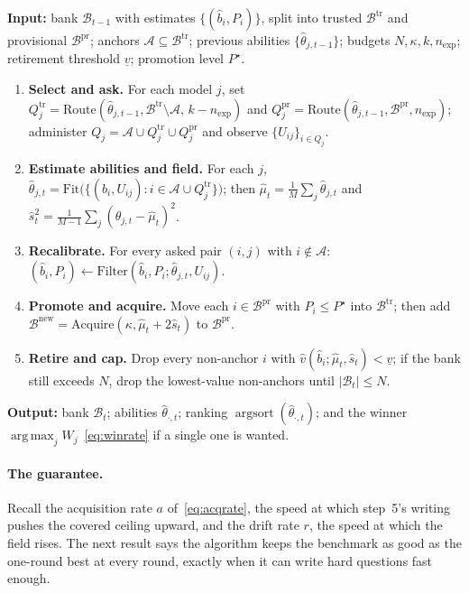 \documentclass[11pt]{article}
\newcommand{\cB}{\mathcal{B}}
\newcommand{\cA}{\mathcal{A}}
\newcommand{\nexp}{n_{\mathrm{exp}}}
\newcommand{\Fit}{\mathrm{Fit}}
\newcommand{\Route}{\mathrm{Route}}
\newcommand{\Filter}{\mathrm{Filter}}
\newcommand{\Acquire}{\mathrm{Acquire}}
\DeclareMathOperator*{\argmax}{arg\,max}
\DeclareMathOperator{\argsort}{argsort}
\theoremstyle{plain}
\theoremstyle{definition}
\theoremstyle{remark}
\begin{document}
\begin{algorithm}[t]
\caption{Online benchmark maintenance, round $t$}
\label{alg:main}
\textbf{Input:} bank $\cB_{t-1}$ with estimates $\{(\hat b_i,P_i)\}$, split into
trusted $\cB^{\mathrm{tr}}$ and provisional $\cB^{\mathrm{pr}}$; anchors
$\cA\subseteq\cB^{\mathrm{tr}}$; previous abilities $\{\hat\theta_{j,t-1}\}$; budgets
$N,\kappa,k,\nexp$; retirement threshold $\underline{v}$; promotion level $P^\star$.
\begin{enumerate}
\item \textbf{Select and ask.} For each model $j$, set
$Q^{\mathrm{tr}}_j=\Route(\hat\theta_{j,t-1},\cB^{\mathrm{tr}}\setminus\cA,\,k-\nexp)$
and $Q^{\mathrm{pr}}_j=\Route(\hat\theta_{j,t-1},\cB^{\mathrm{pr}},\nexp)$;
administer $Q_j=\cA\cup Q^{\mathrm{tr}}_j\cup Q^{\mathrm{pr}}_j$ and observe
$\{U_{ij}\}_{i\in Q_j}$.
\item \textbf{Estimate abilities and field.} For each $j$,
$\hat\theta_{j,t}=\Fit\bigl(\{(\hat b_i,U_{ij}):i\in\cA\cup Q^{\mathrm{tr}}_j\}\bigr)$;
then $\hat\mu_t=\frac1M\sum_j\hat\theta_{j,t}$ and
$\hat s^2_t=\frac{1}{M-1}\sum_j(\hat\theta_{j,t}-\hat\mu_t)^2$.
\item \textbf{Recalibrate.} For every asked pair $(i,j)$ with $i\notin\cA$:
$(\hat b_i,P_i)\leftarrow\Filter(\hat b_i,P_i;\hat\theta_{j,t},U_{ij})$.
\item \textbf{Promote and acquire.} Move each $i\in\cB^{\mathrm{pr}}$ with
$P_i\le P^\star$ into $\cB^{\mathrm{tr}}$; then add
$\cB^{\mathrm{new}}=\Acquire(\kappa,\hat\mu_t+2\hat s_t)$ to $\cB^{\mathrm{pr}}$.
\item \textbf{Retire and cap.} Drop every non-anchor $i$ with
$\hat v(\hat b_i;\hat\mu_t,\hat s_t)<\underline{v}$; if the bank still exceeds $N$,
drop the lowest-value non-anchors until $|\cB_t|\le N$.
\end{enumerate}
\textbf{Output:} bank $\cB_t$; abilities $\hat\theta_{\cdot,t}$; ranking
$\argsort(\hat\theta_{\cdot,t})$; and the winner $\argmax_j W_j$~\eqref{eq:winrate}
if a single one is wanted.
\end{algorithm}

\paragraph{The guarantee.} Recall the acquisition rate $a$ of~\eqref{eq:acqrate},
the speed at which step~5's writing pushes the covered ceiling upward, and the drift
rate $r$, the speed at which the field rises. The next result says the algorithm
keeps the benchmark as good as the one-round best at every round, exactly when it
can write hard questions fast enough.
\end{document}
